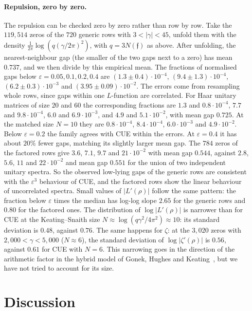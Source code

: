 \documentclass[11pt]{article}
\theoremstyle{remark}
\begin{document}
\paragraph{Repulsion, zero by zero.} The repulsion can be checked zero by zero rather than row by row. Take the $119{,}514$ zeros of
the $720$ generic rows with $3<|\gamma|<45$, unfold them with the density
$\frac1{2\pi}\log(q(\gamma/2\pi)^2)$, with $q=3N(\mathfrak f)$ as above. After unfolding, the
nearest-neighbour gap (the smaller of the two gaps next to a zero) has mean $0.737$, and we
then divide by this empirical mean. The fractions of normalised gaps below
$\varepsilon=0.05,0.1,0.2,0.4$ are $(1.3\pm0.4)\cdot10^{-4}$, $(9.4\pm1.3)\cdot10^{-4}$,
$(6.2\pm0.3)\cdot10^{-3}$ and $(3.95\pm0.09)\cdot10^{-2}$. The errors come from resampling whole
rows, since gaps within one $L$-function are correlated. For Haar unitary matrices of size $20$ and $60$ the corresponding fractions are
$1.3$ and $0.8\cdot10^{-4}$, $7.7$ and $9.8\cdot10^{-4}$, $6.0$ and $6.9\cdot10^{-3}$, and $4.9$
and $5.1\cdot10^{-2}$, with mean gap $0.725$. At the matched size $N=10$ they are $0.8\cdot10^{-4}$,
$8.4\cdot10^{-4}$, $6.0\cdot10^{-3}$ and $4.9\cdot10^{-2}$. Below $\varepsilon=0.2$ the family agrees
with CUE within the errors. At $\varepsilon=0.4$ it has about $20\%$ fewer gaps, matching its
slightly larger mean gap. The $784$ zeros of the factored rows give $3.6$,
$7.1$, $9.7$ and $21\cdot10^{-2}$ with mean gap $0.544$, against $2.8$, $5.6$, $11$ and
$22\cdot10^{-2}$ and mean gap $0.551$ for the union of two independent unitary spectra. So the
observed low-lying gaps of the generic rows are consistent with the $\varepsilon^3$ behaviour of CUE, and the factored rows show the linear
behaviour of uncorrelated spectra. Small values of $|L'(\rho)|$ follow the same pattern: the
fraction below $\varepsilon$ times the median has log-log slope $2.65$ for the generic rows
and $0.80$ for the factored ones. The distribution of $\log|L'(\rho)|$ is narrower than for
CUE at the Keating--Snaith size $N\approx\log(q\gamma^2/4\pi^2)\approx10$: its standard
deviation is $0.48$, against $0.76$. The same happens for $\zeta$: at the $3{,}020$ zeros with
$2{,}000<\gamma<5{,}000$ ($N\approx6$), the standard deviation of $\log|\zeta'(\rho)|$ is $0.56$,
against $0.61$ for CUE with $N=6$. This narrowing goes in the direction of the arithmetic factor
in the hybrid model of Gonek, Hughes and Keating~\cite{GHK}, but we have not tried to account for its
size.

\section{Discussion}\label{sec:disc}
\end{document}
